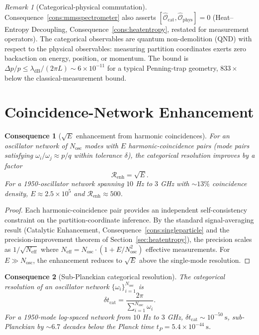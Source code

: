 \documentclass[11pt,twocolumn,a4paper]{article}
\theoremstyle{axiomstyle}
\theoremstyle{conseqstyle}
\newtheorem{consequence}{Consequence}
\theoremstyle{definition}
\theoremstyle{remark}
\newtheorem*{remark}{Remark}
\begin{document}
\begin{remark}[Categorical-physical commutation]
Consequence~\ref{cons:mmsspectrometer} also asserts $[\hat{\mathcal{O}}_{\mathrm{cat}},\hat{\mathcal{O}}_{\mathrm{phys}}]=0$ (Heat--Entropy Decoupling, Consequence~\ref{cons:heatentropy}, restated for measurement operators). The categorical observables are quantum non-demolition (QND) with respect to the physical observables: measuring partition coordinates exerts zero backaction on energy, position, or momentum. The bound is $\Delta p/p\leq\lambda_{\mathrm{dB}}/(2\pi L)\sim 6\times 10^{-11}$ for a typical Penning-trap geometry, $833\times$ below the classical-measurement bound.
\end{remark}

\section{Coincidence-Network Enhancement}
\label{sec:coincidence}

\begin{consequence}[$\sqrt{E}$ enhancement from harmonic coincidences]\label{cons:coincidenceenh}
For an oscillator network of $N_{\mathrm{osc}}$ modes with $E$ harmonic-coincidence pairs (mode pairs satisfying $\omega_{i}/\omega_{j}\approx p/q$ within tolerance $\delta$), the categorical resolution improves by a factor
\begin{equation}
\mathcal{R}_{\mathrm{enh}}=\sqrt{E}.
\end{equation}
For a 1950-oscillator network spanning $10$ Hz to $3$ GHz with $\sim 13\%$ coincidence density, $E\approx 2.5\times 10^{5}$ and $\mathcal{R}_{\mathrm{enh}}\approx 500$.
\end{consequence}

\begin{proof}
Each harmonic-coincidence pair provides an independent self-consistency constraint on the partition-coordinate inference. By the standard signal-averaging result (Catalytic Enhancement, Consequence~\ref{cons:singleparticle} and the precision-improvement theorem of Section~\ref{sec:heatentropy}), the precision scales as $1/\sqrt{N_{\mathrm{eff}}}$ where $N_{\mathrm{eff}}=N_{\mathrm{osc}}\cdot(1+E/N_{\mathrm{osc}}^{2})$ effective measurements. For $E\gg N_{\mathrm{osc}}$, the enhancement reduces to $\sqrt{E}$ above the single-mode resolution.
\end{proof}

\begin{consequence}[Sub-Planckian categorical resolution]\label{cons:subplanck}
The categorical resolution of an oscillator network $\{\omega_{i}\}_{i=1}^{N_{\mathrm{osc}}}$ is
\begin{equation}
\delta t_{\mathrm{cat}}=\frac{2\pi}{\sum_{i=1}^{N_{\mathrm{osc}}}\omega_{i}}.
\end{equation}
For a 1950-mode log-spaced network from $10$ Hz to $3$ GHz, $\delta t_{\mathrm{cat}}\sim 10^{-50}~\mathrm{s}$, sub-Planckian by $\sim 6.7$ decades below the Planck time $t_{P}=5.4\times 10^{-44}~\mathrm{s}$.
\end{consequence}
\end{document}
